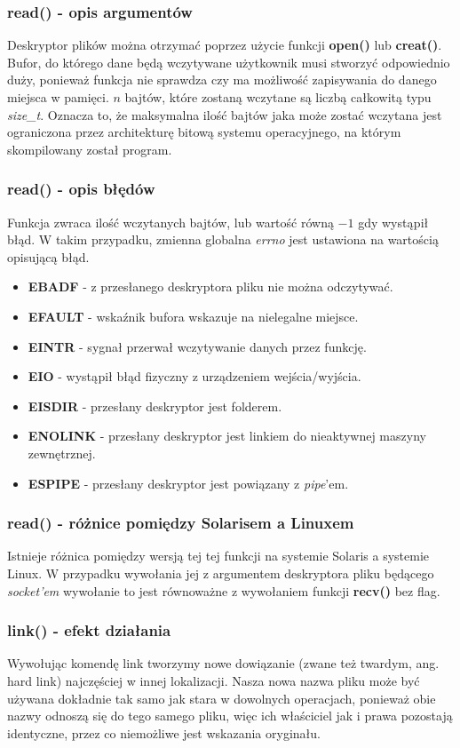 \documentclass{beamer}
\begin{document}
\begin{frame}
	\frametitle{read() - opis argumentów}
Deskryptor plików można otrzymać poprzez użycie funkcji \textbf{open()} lub \textbf{creat()}.
Bufor, do którego dane będą wczytywane użytkownik musi stworzyć odpowiednio duży, ponieważ funkcja nie sprawdza czy ma możliwość zapisywania do danego miejsca w pamięci.
$n$ bajtów, które zostaną wczytane są liczbą całkowitą typu \textit{size\_t}.
Oznacza to, że maksymalna ilość bajtów jaka może zostać wczytana jest ograniczona przez architekturę bitową systemu operacyjnego, na którym skompilowany został program.
\end{frame}

\begin{frame}
	\frametitle{read() - opis błędów}
Funkcja zwraca ilość wczytanych bajtów, lub wartość równą $-1$ gdy wystąpił błąd.
W takim przypadku, zmienna globalna \textit{errno} jest ustawiona na wartością opisującą błąd.

\begin{itemize}
\item \textbf{EBADF} - z przesłanego deskryptora pliku nie można odczytywać.
\item \textbf{EFAULT} - wskaźnik bufora wskazuje na nielegalne miejsce.
\item \textbf{EINTR} - sygnał przerwał wczytywanie danych przez funkcję.
\item \textbf{EIO} - wystąpił błąd fizyczny z urządzeniem wejścia/wyjścia.
\item \textbf{EISDIR} - przesłany deskryptor jest folderem.
\item \textbf{ENOLINK} - przesłany deskryptor jest linkiem do nieaktywnej maszyny zewnętrznej.
\item \textbf{ESPIPE} - przesłany deskryptor jest powiązany z \textit{pipe}'em.
\end{itemize}
\end{frame}

\begin{frame}
	\frametitle{read() - różnice pomiędzy Solarisem a Linuxem}
Istnieje różnica pomiędzy wersją tej tej funkcji na systemie Solaris a systemie Linux.
W przypadku wywołania jej z argumentem deskryptora pliku będącego \textit{socket'em} wywołanie to jest równoważne z wywołaniem funkcji \textbf{recv()} bez flag.
\end{frame}

\begin{frame}
	\frametitle{link() - efekt działania}
Wywołując komendę link tworzymy nowe dowiązanie (zwane też twardym, ang. hard link) najczęściej w innej lokalizacji. Nasza nowa nazwa pliku może być używana dokładnie tak samo jak stara w dowolnych operacjach, ponieważ obie nazwy odnoszą się do tego samego pliku, więc ich właściciel jak i prawa pozostają identyczne, przez co niemożliwe jest wskazania oryginału.
\end{frame}
\end{document}
